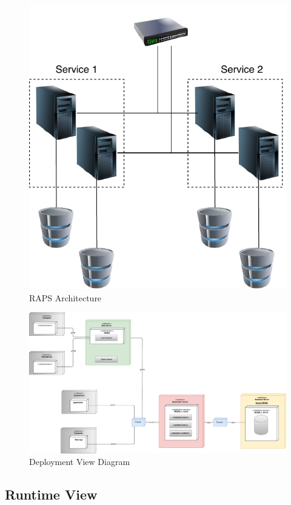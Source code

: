 \documentclass[12pt,a4paper]{article}
\begin{document}
		\begin{figure}[H]
			\centering
			\includegraphics[width=0.6\linewidth]{images/raps}
			\caption{RAPS Architecture}
			\label{fig:raps}
		\end{figure}
		

		\begin{figure}[H]
		\centering
		\includegraphics[width=1.0\linewidth]{images/deployment_diagram}
		\caption{Deployment View Diagram}
		\label{fig:deploymentdiagram}
		\end{figure}
	\subsection{Runtime View}
		



	\newpage
\end{document}
